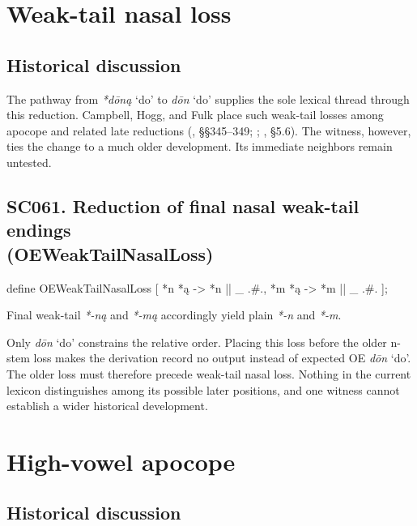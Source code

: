 \documentclass[
  british,
  a4paper,
  openany]{book}
\providecommand{\Recon}[1]{\emph{*#1}}
{\catcode`→=\active \global\def→{\ensuremath{\rightarrow}}}
\providecommand{\texorpdfstring}[2]{#1}
\DeclareRobustCommand{\CAPRRuleHeading}[2]{%
  #1\texorpdfstring{\\(#2)}{ (#2)}%
}
\providecommand{\Recon}[1]{\emph{*#1}}
{\catcode`→=\active \global\def→{\ensuremath{\rightarrow}}}
\begin{document}
\newpage

\section{Weak-tail nasal loss}\label{weak-tail-nasal-loss}

\subsection{Historical discussion}\label{historical-discussion-33}

The pathway from \Recon{dōną} `do' to \emph{dōn} `do' supplies the sole
lexical thread through this reduction. Campbell, Hogg, and Fulk place
such weak-tail losses among apocope and related late reductions
(, §§345--349;
;
, §5.6). The witness, however,
ties the change to a much older development. Its immediate neighbors
remain untested.

\subsection{\texorpdfstring{\CAPRRuleHeading{SC061. Reduction of final nasal weak-tail endings}{OEWeakTailNasalLoss}}{}}\label{rule-OEWeakTailNasalLoss}

\begin{ReaderFacingFoma}
define OEWeakTailNasalLoss [
    {*n} {*ą} -> {*n} || _ .#.,
    {*m} {*ą} -> {*m} || _ .#.
];
\end{ReaderFacingFoma}

Final weak-tail \emph{*-ną} and \emph{*-mą} accordingly yield plain
\emph{*-n} and \emph{*-m}.

Only \emph{dōn} `do' constrains the relative order. Placing this loss
before the older n-stem loss makes the derivation record no output
instead of expected OE \emph{dōn} `do'. The older loss must therefore
precede weak-tail nasal loss. Nothing in the current lexicon
distinguishes among its possible later positions, and one witness cannot
establish a wider historical development.

\newpage

\section{High-vowel apocope}\label{high-vowel-apocope}

\subsection{Historical discussion}\label{historical-discussion-34}
\end{document}
